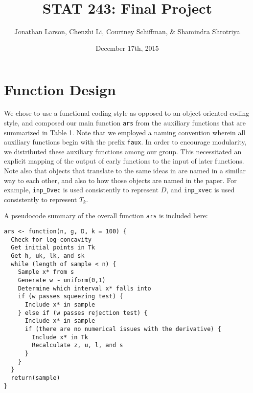 \documentclass{article}\usepackage[]{graphicx}\usepackage[]{color}
\begin{document}
 
\title{STAT 243: Final Project}
\author{Jonathan Larson, Chenzhi Li, Courtney Schiffman, \& Shamindra Shrotriya}
\date{December 17th, 2015}

\maketitle

\section{Function Design}

We chose to use a functional coding style as opposed to an object-oriented coding style,
and composed our main function \texttt{ars} from the auxiliary functions
that are summarized in Table 1.
Note that we employed a naming convention wherein all auxiliary functions
begin with the prefix \texttt{faux}.
In order to encourage modularity, we distributed these auxiliary functions
among our group. This necessitated an explicit mapping of the output of early
functions to the input of later functions.
Note also that objects that translate to the same ideas in \cite{Gilks:Wild:1992} are named
in a similar way to each other, and also to how those objects are named
in the paper. For example, \texttt{inp\_Dvec} is used consistently
to represent $D$, and \texttt{inp\_xvec} is used consistently to represent
$T_k$.

A pseudocode summary of the overall function \texttt{ars} is included here:
\begin{verbatim}
ars <- function(n, g, D, k = 100) {
  Check for log-concavity
  Get initial points in Tk
  Get h, uk, lk, and sk
  while (length of sample < n) {
    Sample x* from s
    Generate w ~ uniform(0,1)
    Determine which interval x* falls into
    if (w passes squeezing test) {
      Include x* in sample
    } else if (w passes rejection test) {
      Include x* in sample
      if (there are no numerical issues with the derivative) {
        Include x* in Tk
        Recalculate z, u, l, and s
      }
    }
  }
  return(sample)
}
\end{verbatim}
\end{document}
